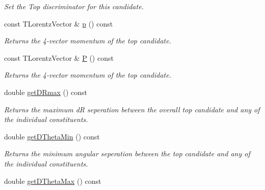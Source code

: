 \begin{DoxyCompactItemize}
\begin{DoxyCompactList}\small\item\em Set the Top discriminator for this candidate. \end{DoxyCompactList}\item 
\hypertarget{classTopObject_a52fbbf2a336d0e174f509304f8c1c984}{const T\-Lorentz\-Vector \& \hyperlink{classTopObject_a52fbbf2a336d0e174f509304f8c1c984}{p} () const }\label{classTopObject_a52fbbf2a336d0e174f509304f8c1c984}

\begin{DoxyCompactList}\small\item\em Returns the 4-\/vector momentum of the top candidate. \end{DoxyCompactList}\item 
\hypertarget{classTopObject_ac59c3a52925131b1ea7e5bf5c014aa2d}{const T\-Lorentz\-Vector \& \hyperlink{classTopObject_ac59c3a52925131b1ea7e5bf5c014aa2d}{P} () const }\label{classTopObject_ac59c3a52925131b1ea7e5bf5c014aa2d}

\begin{DoxyCompactList}\small\item\em Returns the 4-\/vector momentum of the top candidate. \end{DoxyCompactList}\item 
\hypertarget{classTopObject_ad6c8e1a0ef46d400075b1c2dbb05e37d}{double \hyperlink{classTopObject_ad6c8e1a0ef46d400075b1c2dbb05e37d}{get\-D\-Rmax} () const }\label{classTopObject_ad6c8e1a0ef46d400075b1c2dbb05e37d}

\begin{DoxyCompactList}\small\item\em Returns the maximum d\-R seperation between the overall top candidate and any of the individual constituents. \end{DoxyCompactList}\item 
\hypertarget{classTopObject_a6751962b83bc4b348cebee05aa23c299}{double \hyperlink{classTopObject_a6751962b83bc4b348cebee05aa23c299}{get\-D\-Theta\-Min} () const }\label{classTopObject_a6751962b83bc4b348cebee05aa23c299}

\begin{DoxyCompactList}\small\item\em Returns the minimum angular seperation between the top candidate and any of the individual constituents. \end{DoxyCompactList}\item 
\hypertarget{classTopObject_afd9525b26ff81392af3773c5c88f2f68}{double \hyperlink{classTopObject_afd9525b26ff81392af3773c5c88f2f68}{get\-D\-Theta\-Max} () const }\label{classTopObject_afd9525b26ff81392af3773c5c88f2f68}


\end{DoxyCompactItemize}
